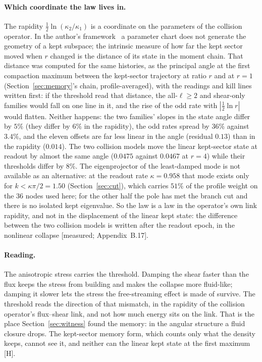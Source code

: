 \documentclass[11pt]{article}
\newcommand{\grade}[1]{\textsf{\small[#1]}}
\begin{document}
\paragraph{Which coordinate the law lives in.} The rapidity $\tfrac12\ln(\kappa_2/\kappa_1)$ is a coordinate on the parameters of the collision operator. In the author's framework~\cite{IQGT} a parameter chart does not generate the geometry of a kept subspace; the intrinsic measure of how far the kept sector moved when $r$ changed is the distance of its state in the moment chain. That distance was computed for the same histories, as the principal angle at the first compaction maximum between the kept-sector trajectory at ratio $r$ and at $r=1$ (Section~\ref{sec:memory}'s chain, profile-averaged), with the readings and kill lines written first: if the threshold read that distance, the all-$\ell\ge2$ and shear-only families would fall on one line in it, and the rise of the odd rate with $|\tfrac12\ln r|$ would flatten. Neither happens: the two families' slopes in the state angle differ by $5\%$ (they differ by $6\%$ in the rapidity), the odd rates spread by $36\%$ against $3.4\%$, and the eleven offsets are far less linear in the angle (residual $0.13$) than in the rapidity ($0.014$). The two collision models move the linear kept-sector state at readout by almost the same angle ($0.0475$ against $0.0467$ at $r=4$) while their thresholds differ by $8\%$. The eigenprojector of the least-damped mode is not available as an alternative: at the readout rate $\kappa=0.958$ that mode exists only for $k<\kappa\pi/2=1.50$ (Section~\ref{sec:cut}), which carries $51\%$ of the profile weight on the $36$ nodes used here; for the other half the pole has met the branch cut and there is no isolated kept eigenvalue. So the law is a law in the operator's own link rapidity, and not in the displacement of the linear kept state: the difference between the two collision models is written after the readout epoch, in the nonlinear collapse \grade{measured; Appendix~B.17}.

\paragraph{Reading.} The anisotropic stress carries the threshold. Damping the shear faster than the flux keeps the stress from building and makes the collapse more fluid-like; damping it slower lets the stress the free-streaming effect is made of survive. The threshold reads the direction of that mismatch, in the rapidity of the collision operator's flux--shear link, and not how much energy sits on the link. That is the place Section~\ref{sec:witness} found the memory: in the angular structure a fluid closure drops. The kept-sector memory form, which counts only what the density keeps, cannot see it, and neither can the linear kept state at the first maximum \grade{H}.
\end{document}
